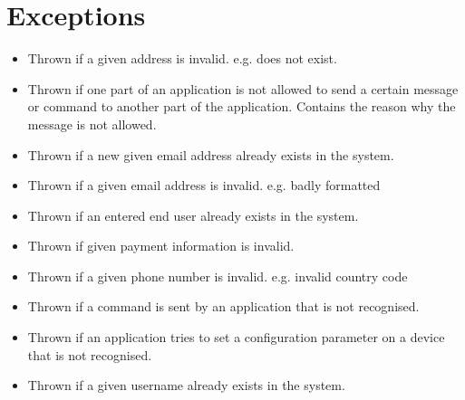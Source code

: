 
\section{Exceptions}\label{sec:exceptions}
\begin{itemize}[nolistsep,noitemsep]
\item {}
Thrown if a given address is invalid. e.g. does not exist.
\item {}
Thrown if one part of an application is not allowed to send a certain message or command to another part of the application. Contains the reason why the message is not allowed.
\item {}
Thrown if a new given email address already exists in the system.
\item {}
Thrown if a given email address is invalid. e.g. badly formatted
\item {}
Thrown if an entered end user already exists in the system.
\item {}
Thrown if given payment information is invalid.
\item {}
Thrown if a given phone number is invalid. e.g. invalid country code
\item {}
Thrown if a command is sent by an application that is not recognised.
\item {}
Thrown if an application tries to set a configuration parameter on a device that is not recognised.
\item {}
Thrown if a given username already exists in the system.
\end{itemize}

